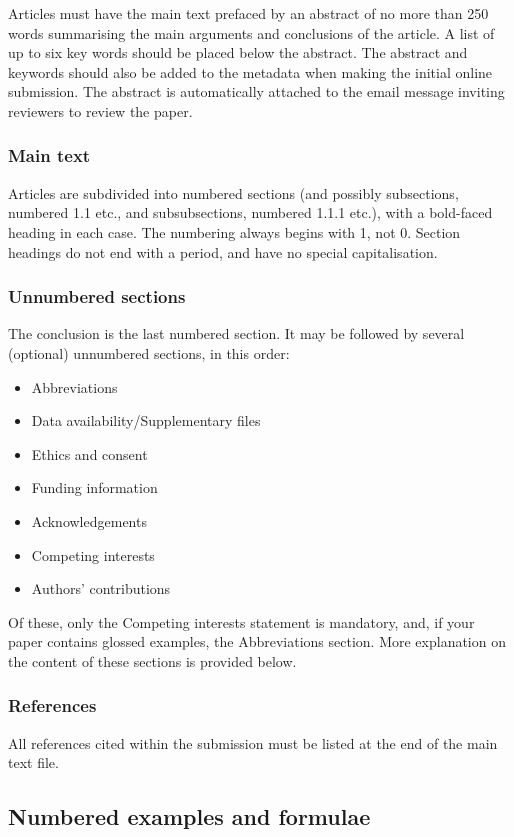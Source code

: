 \documentclass[charis,linguex]{glossa}
\begin{document}
Articles must have the main text prefaced by an abstract of no more than 250 words summarising the main arguments and conclusions of the article. A list of up to six key words should be placed below the abstract. The abstract and keywords should also be added to the metadata when making the initial online submission. The abstract is automatically attached to the email message inviting reviewers to review the paper.

\subsubsection{Main text}

Articles are subdivided into numbered sections (and possibly subsections, numbered 1.1 etc., and subsubsections, numbered 1.1.1 etc.), with a bold-faced heading in each case. The numbering always begins with 1, not 0. Section headings do not end with a period, and have no special capitalisation.

\subsubsection{Unnumbered sections}
The conclusion is the last numbered section. It may be followed by several (optional) unnumbered sections, in this order: 
\begin{itemize}
\item Abbreviations
\item Data availability/Supplementary files
\item Ethics and consent
\item Funding information
\item Acknowledgements
\item Competing interests
\item Authors' contributions
\end{itemize}

\noindent Of these, only the Competing interests statement is mandatory, and, if your paper contains glossed examples, the Abbreviations section. More explanation on the content of these sections is provided below.

\subsubsection{References}
All references cited within the submission must be listed at the end of the main text file.

\subsection{Numbered examples and formulae}
\end{document}
